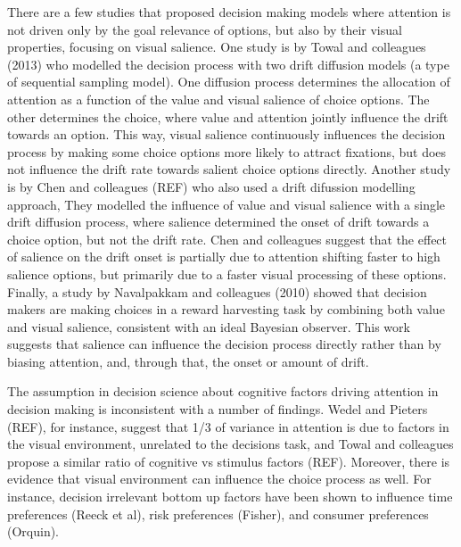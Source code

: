 \documentclass{article}
\begin{document}
There are a few studies that proposed decision making models where attention is not driven only by the goal relevance of options, but also by their visual properties, focusing on visual salience. One study is by Towal and colleagues (2013) who modelled the decision process with two drift diffusion models (a type of sequential sampling model). One diffusion process determines the allocation of attention as a function of the value and visual salience of choice options. The other determines the choice, where value and attention jointly influence the drift towards an option. This way, visual salience continuously influences the decision process by making some choice options more likely to attract fixations, but does not influence the drift rate towards salient choice options directly. Another study is by Chen and colleagues (REF) who also used a drift difussion modelling approach, They modelled the influence of value and visual salience with a single drift diffusion process, where salience determined the onset of drift towards a choice option, but not the drift rate. Chen and colleagues suggest that the effect of salience on the drift onset is partially due to attention shifting faster to high salience options, but primarily due to a faster visual processing of these options. Finally, a study by Navalpakkam and colleagues (2010) showed that decision makers are making choices in a reward harvesting task by combining both value and visual salience, consistent with an ideal Bayesian observer. This work suggests that salience can influence the decision process directly rather than by biasing attention, and, through that, the onset or amount of drift. 



The assumption in decision science about cognitive factors driving attention in decision making is inconsistent with a number of findings. Wedel and Pieters (REF), for instance, suggest that 1/3 of variance in attention is due to factors in the visual environment, unrelated to the decisions task, and Towal and colleagues propose a similar ratio of cognitive vs stimulus factors (REF). Moreover, there is evidence that visual environment can influence the choice process as well. For instance, decision irrelevant bottom up factors have been shown to influence time preferences (Reeck et al), risk preferences (Fisher), and consumer preferences (Orquin).
\end{document}

